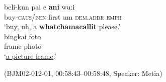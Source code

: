\documentclass[output=paper,colorlinks,citecolor=brown
\ChapterDOI{10.5281/zenodo.15697585}
]{langscibook}
\begin{document}
\begin{exe}
    \ex\label{ex:place-ani} \begin{xlist}[0\quad →A:]
         \gll
        beli-kun pai e \textbf{ani} wu:i \\
        buy-\textsc{caus/ben} first um \textsc{dem.addr} \textsc{emph}\\
        \glt `buy, uh, a \textbf{whatchamacallit} please.' \\
        \exi{2\quad \hphantom{→M:}} \gll
        \uline{bingkai foto} \\
        {frame photo} \\
        \glt `\uline{a picture frame}.' \\
    \end{xlist}
    \hfill (BJM02-012-01, 00:58:43–00:58:48, Speaker: Metia) 
\end{exe}




\end{document}
